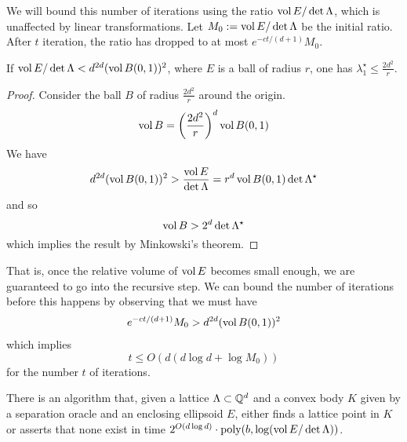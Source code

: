 We will bound this number of iterations using the ratio $\operatorname{vol} E / \det \Lambda$,
which is unaffected by linear transformations.
Let $M_0 := \operatorname{vol} E  / \det \Lambda$ be the initial ratio.
After $t$ iteration, the ratio has dropped to at most $e^{-ct/(d+1)} M_0$.

\begin{lemma}
  If $\operatorname{vol} E / \det \Lambda < d^{2d} (\operatorname{vol} B(0,1))^2$,
  where $E$ is a ball of radius $r$,
  one has $\lambda_1^\star \leq \frac{2d^2}{r}$.
\end{lemma}
\begin{proof}
  Consider the ball $B$ of radius $\frac{2d^2}{r}$ around the origin.
  \[
    \operatorname{vol} B = \left(\frac{2d^2}{r}\right)^d \operatorname{vol} B(0,1)
  \]
  We have
  \[
    d^{2d} (\operatorname{vol} B(0,1))^2 > \frac{\operatorname{vol} E}{\det \Lambda} = r^d \operatorname{vol} B(0,1) \det \Lambda^\star
  \]
  and so
  \[
    \operatorname{vol} B > 2^d \det \Lambda^\star
  \]
  which implies the result by Minkowski's theorem.
\end{proof}

That is, once the relative volume of $\operatorname{vol} E$ becomes small enough,
we are guaranteed to go into the recursive step.
We can bound the number of iterations before this happens by observing that we must have
\begin{align*}
  e^{-ct/(d+1)} M_0 > d^{2d} (\operatorname{vol} B(0,1))^2
\end{align*}
which implies
\[
  t \leq O(d (d \log d + \log M_0))
\]
for the number $t$ of iterations.

\begin{theorem}
  There is an algorithm that,
  given a lattice $\Lambda \subset \mathbb{Q}^d$ and a convex body $K$ given by a separation oracle
  and an enclosing ellipsoid $E$,
  either finds a lattice point in $K$ or asserts that none exist
  in time $2^{O(d \log d)} \cdot \operatorname{poly}(b, \log(\operatorname{vol} E / \det \Lambda))$.
\end{theorem}




